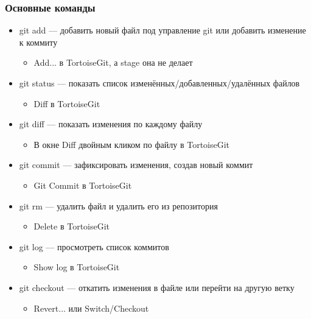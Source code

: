 \documentclass[xetex,mathserif,serif]{beamer}
\begin{document}
    \begin{frame}
        \frametitle{Основные команды}
        \begin{itemize}
            \item git add --- добавить новый файл под управление git или добавить изменение к коммиту
            \begin{itemize}
                \item Add... в TortoiseGit, а stage она не делает
            \end{itemize}
            \item git status --- показать список изменённых/добавленных/удалённых файлов
            \begin{itemize}
                \item Diff в TortoiseGit
            \end{itemize}
            \item git diff --- показать изменения по каждому файлу
            \begin{itemize}
                \item В окне Diff двойным кликом по файлу в TortoiseGit
            \end{itemize}
            \item git commit --- зафиксировать изменения, создав новый коммит
            \begin{itemize}
                \item Git Commit в TortoiseGit
            \end{itemize}
            \item git rm --- удалить файл и удалить его из репозитория
            \begin{itemize}
                \item Delete в TortoiseGit
            \end{itemize}
            \item git log --- просмотреть список коммитов
            \begin{itemize}
                \item Show log в TortoiseGit
            \end{itemize}
            \item git checkout --- откатить изменения в файле или перейти на другую ветку
            \begin{itemize}
                \item Revert... или Switch/Checkout
            \end{itemize}
        \end{itemize}
    \end{frame}
\end{document}
